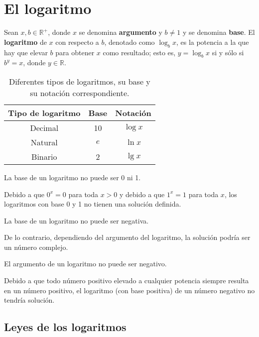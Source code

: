 \chapter{El logaritmo}

Sean \(x,b\in\mathbb{R}^+\), donde \(x\) se denomina \textbf{argumento} y \(b\neq 1\) y se denomina \textbf{base}.
El \textbf{logaritmo} de \(x\) con respecto a \(b\), denotado como \(\log_{b}x\), es la potencia a la que hay que elevar \(b\) para obtener \(x\) como resultado; esto es, \(y=\log_{b}x\) si y sólo si \(b^{y}=x\), donde \(y\in\mathbb{R}\).

\begin{table}[h]
  \caption{Diferentes tipos de logaritmos, su base y su notación correspondiente.}
  \begin{center}
    \begin{tabular}{ccc}
      \toprule
      Tipo de logaritmo & Base & Notación \\
      \midrule
      Decimal & 10 & \(\log{x}\) \\
      Natural & \(e\) & \(\ln{x}\) \\
      Binario & 2 & \(\lg{x}\) \\
      \bottomrule
    \end{tabular}
  \end{center}
\end{table}

\begin{prop}
  La base de un logaritmo no puede ser 0 ni 1.
\end{prop}
  
Debido a que \(0^x=0\) para toda \(x>0\) y debido a que \(1^x=1\) para toda \(x\), los logaritmos con base 0 y 1 no tienen una solución definida.

\begin{prop}
  La base de un logaritmo no puede ser negativa.
\end{prop}

De lo contrario, dependiendo del argumento del logaritmo, la solución podría ser un número complejo.

\begin{prop}
  El argumento de un logaritmo no puede ser negativo.
\end{prop}

Debido a que todo número positivo elevado a cualquier potencia siempre resulta en un número positivo, el logaritmo (con base positiva) de un número negativo no tendría solución.

\section{Leyes de los logaritmos}

